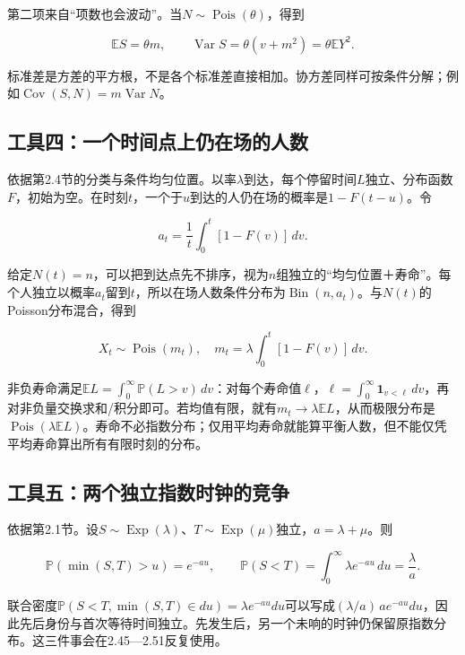 \documentclass[12pt,a4paper,UTF8,fontset=fandol]{ctexart}
\begin{document}
第二项来自``项数也会波动''。当\(N\sim\operatorname{Pois}(\theta)\)，得到

\[
\boxed{\mathbb ES=\theta m,\qquad
\operatorname{Var}S=\theta(v+m^2)=\theta\mathbb EY^2.}
\]

标准差是方差的平方根，不是各个标准差直接相加。协方差同样可按条件分解；例如\(\operatorname{Cov}(S,N)=m\operatorname{Var}N\)。

\subsection{工具四：一个时间点上仍在场的人数}\label{ux5de5ux5177ux56dbux4e00ux4e2aux65f6ux95f4ux70b9ux4e0aux4ecdux5728ux573aux7684ux4ebaux6570}

依据第2.4节的分类与条件均匀位置。以率\(\lambda\)到达，每个停留时间\(L\)独立、分布函数\(F\)，初始为空。在时刻\(t\)，一个于\(u\)到达的人仍在场的概率是\(1-F(t-u)\)。令

\[
a_t=\frac1t\int_0^t[1-F(v)]\,dv.
\]

给定\(N(t)=n\)，可以把到达点先不排序，视为\(n\)组独立的``均匀位置＋寿命''。每个人独立以概率\(a_t\)留到\(t\)，所以在场人数条件分布为\(\operatorname{Bin}(n,a_t)\)。与\(N(t)\)的Poisson分布混合，得到

\[
\boxed{X_t\sim\operatorname{Pois}(m_t),\quad
m_t=\lambda\int_0^t[1-F(v)]\,dv.}
\]

非负寿命满足\(\mathbb EL=\int_0^\infty\mathbb P(L>v)\,dv\)：对每个寿命值\(\ell\)，\(\ell=\int_0^\infty\mathbf1_{v<\ell}\,dv\)，再对非负量交换求和/积分即可。若均值有限，就有\(m_t\to\lambda\mathbb EL\)，从而极限分布是\(\operatorname{Pois}(\lambda\mathbb EL)\)。寿命不必指数分布；仅用平均寿命就能算平衡人数，但不能仅凭平均寿命算出所有有限时刻的分布。

\subsection{工具五：两个独立指数时钟的竞争}\label{ux5de5ux5177ux4e94ux4e24ux4e2aux72ecux7acbux6307ux6570ux65f6ux949fux7684ux7adeux4e89}

依据第2.1节。设\(S\sim\operatorname{Exp}(\lambda)\)、\(T\sim\operatorname{Exp}(\mu)\)独立，\(a=\lambda+\mu\)。则

\[
\mathbb P(\min(S,T)>u)=e^{-au},\qquad
\mathbb P(S<T)=\int_0^\infty\lambda e^{-au}\,du=\frac\lambda a.
\]

联合密度\(\mathbb P(S<T,\min(S,T)\in du)=\lambda e^{-au}du\)可以写成\((\lambda/a)\,ae^{-au}du\)，因此先后身份与首次等待时间独立。先发生后，另一个未响的时钟仍保留原指数分布。这三件事会在2.45---2.51反复使用。
\end{document}
